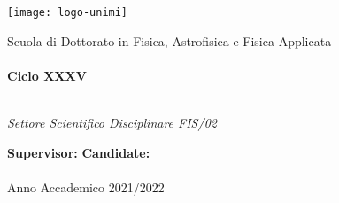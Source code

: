 

\begin{center}
	\texttt{[image: logo-unimi]}
	\vspace*{10pt}

	Scuola di Dottorato in Fisica, Astrofisica e Fisica Applicata\\
	\myDepartment\\
	\vspace*{5pt}
	\textbf{Ciclo XXXV}

	\vfill

	{\Huge \myTitle}\\
	\vspace*{30pt}
	\textit{Settore Scientifico Disciplinare FIS/02}\\

	\vfill

	\textbf{Supervisor:} \hfill \textbf{Candidate:}\\
	\myProf \hfill \myName\\
	\vspace*{15pt}
	Anno Accademico 2021/2022
\end{center}
	
	

\cleardoublepage
\restoregeometry
